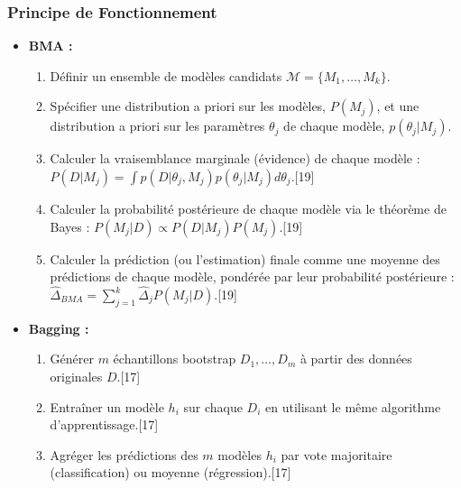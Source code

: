 \documentclass[11pt,a4paper]{article}
\begin{document}
\subsubsection{Principe de Fonctionnement}
\begin{itemize}
    \item \textbf{BMA :}
        \begin{enumerate}
            \item Définir un ensemble de modèles candidats $\mathcal{M} = \{M_1, \dots, M_k\}$.
            \item Spécifier une distribution a priori sur les modèles, $P(M_j)$, et une distribution a priori sur les paramètres $\theta_j$ de chaque modèle, $p(\theta_j | M_j)$.
            \item Calculer la vraisemblance marginale (évidence) de chaque modèle : $P(D | M_j) = \int p(D | \theta_j, M_j) p(\theta_j | M_j) d\theta_j$.[19]
            \item Calculer la probabilité postérieure de chaque modèle via le théorème de Bayes : $P(M_j | D) \propto P(D | M_j) P(M_j)$.[19]
            \item Calculer la prédiction (ou l'estimation) finale comme une moyenne des prédictions de chaque modèle, pondérée par leur probabilité postérieure : $\hat{\Delta}_{BMA} = \sum_{j=1}^{k} \hat{\Delta}_j P(M_j | D)$.[19]
        \end{enumerate}
    \item \textbf{Bagging :}
        \begin{enumerate}
            \item Générer $m$ échantillons bootstrap $D_1, \dots, D_m$ à partir des données originales $D$.[17]
            \item Entraîner un modèle $h_i$ sur chaque $D_i$ en utilisant le même algorithme d'apprentissage.[17]
            \item Agréger les prédictions des $m$ modèles $h_i$ par vote majoritaire (classification) ou moyenne (régression).[17]
        \end{enumerate}
\end{itemize}
\end{document}
